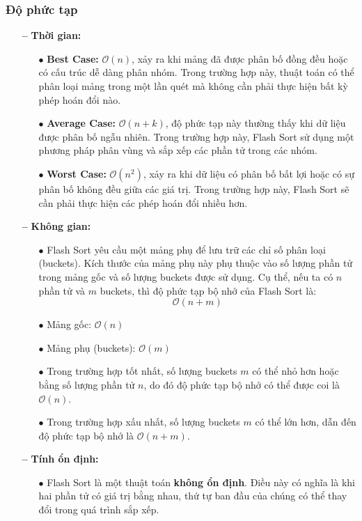 \subsubsection{Độ phức tạp}
\begin{itemize}
    \item[\textbf{--}] \textbf{Thời gian:}
    \begin{itemize}
        \item[$\bullet$] \textbf{Best Case:} \(\mathcal{O}(n)\), xảy ra khi mảng đã được phân bố đồng đều hoặc có cấu trúc dễ dàng phân nhóm. Trong trường hợp này, thuật toán có thể phân loại mảng trong một lần quét mà không cần phải thực hiện bất kỳ phép hoán đổi nào.
        \item[$\bullet$] \textbf{Average Case:} \(\mathcal{O}(n + k)\), độ phức tạp này thường thấy khi dữ liệu được phân bố ngẫu nhiên. Trong trường hợp này, Flash Sort sử dụng một phương pháp phân vùng và sắp xếp các phần tử trong các nhóm.
        \item[$\bullet$] \textbf{Worst Case:} \(\mathcal{O}(n^2)\), xảy ra khi dữ liệu có phân bố bất lợi hoặc có sự phân bố không đều giữa các giá trị. Trong trường hợp này, Flash Sort sẽ cần phải thực hiện các phép hoán đổi nhiều hơn.
    \end{itemize}
    \item[\textbf{--}] \textbf{Không gian:}
    \begin{itemize}
        \item[$\bullet$] Flash Sort yêu cầu một mảng phụ để lưu trữ các chỉ số phân loại (buckets). Kích thước của mảng phụ này phụ thuộc vào số lượng phần tử trong mảng gốc và số lượng buckets được sử dụng. Cụ thể, nếu ta có \(n\) phần tử và \(m\) buckets, thì độ phức tạp bộ nhớ của Flash Sort là:
        \[
        \mathcal{O}(n + m)
        \]
        \item[$\bullet$] Mảng gốc: \(\mathcal{O}(n)\)
        \item[$\bullet$] Mảng phụ (buckets): \(\mathcal{O}(m)\)
        \item[$\bullet$] Trong trường hợp tốt nhất, số lượng buckets \(m\) có thể nhỏ hơn hoặc bằng số lượng phần tử \(n\), do đó độ phức tạp bộ nhớ có thể được coi là \(\mathcal{O}(n)\).
        \item[$\bullet$] Trong trường hợp xấu nhất, số lượng buckets \(m\) có thể lớn hơn, dẫn đến độ phức tạp bộ nhớ là \(\mathcal{O}(n + m)\).
    \end{itemize}
    \item[\textbf{--}] \textbf{Tính ổn định:}
    \begin{itemize}
        \item[$\bullet$] Flash Sort là một thuật toán \textbf{không ổn định}. Điều này có nghĩa là khi hai phần tử có giá trị bằng nhau, thứ tự ban đầu của chúng có thể thay đổi trong quá trình sắp xếp.
    \end{itemize}
\end{itemize}
